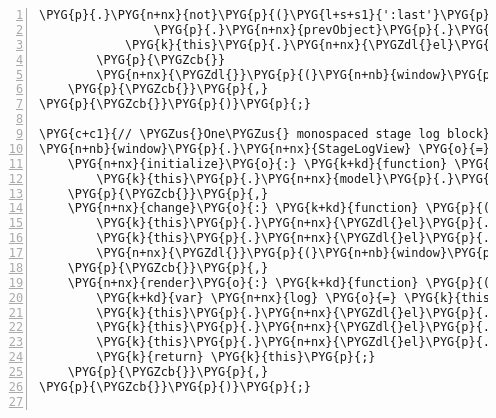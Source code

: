 \begin{Verbatim}[commandchars=\\\{\},numbers=left,firstnumber=1,stepnumber=5]
                \PYG{p}{.}\PYG{n+nx}{not}\PYG{p}{(}\PYG{l+s+s1}{':last'}\PYG{p}{)}\PYG{p}{.}\PYG{n+nx}{css}\PYG{p}{(}\PYG{l+s+s1}{'background-color'}\PYG{p}{,} \PYG{l+s+s1}{''}\PYG{p}{)}
                \PYG{p}{.}\PYG{n+nx}{prevObject}\PYG{p}{.}\PYG{n+nx}{last}\PYG{p}{(}\PYG{p}{)}\PYG{p}{.}\PYG{n+nx}{css}\PYG{p}{(}\PYG{l+s+s1}{'background-color'}\PYG{p}{,} \PYG{l+s+s1}{'\PYGZsh{}ddf'}\PYG{p}{)}\PYG{p}{;}
            \PYG{k}{this}\PYG{p}{.}\PYG{n+nx}{\PYGZdl{}el}\PYG{p}{.}\PYG{n+nx}{contents}\PYG{p}{(}\PYG{p}{)}\PYG{p}{.}\PYG{n+nx}{last}\PYG{p}{(}\PYG{p}{)}\PYG{p}{.}\PYG{n+nx}{scrollToBottom}\PYG{p}{(}\PYG{p}{)}\PYG{p}{;}
        \PYG{p}{\PYGZcb{}}
        \PYG{n+nx}{\PYGZdl{}}\PYG{p}{(}\PYG{n+nb}{window}\PYG{p}{)}\PYG{p}{.}\PYG{n+nx}{scrollspy}\PYG{p}{(}\PYG{l+s+s1}{'refresh'}\PYG{p}{)}\PYG{p}{;}
    \PYG{p}{\PYGZcb{}}\PYG{p}{,}
\PYG{p}{\PYGZcb{}}\PYG{p}{)}\PYG{p}{;}

\PYG{c+c1}{// \PYGZus{}One\PYGZus{} monospaced stage log block}
\PYG{n+nb}{window}\PYG{p}{.}\PYG{n+nx}{StageLogView} \PYG{o}{=} \PYG{n+nx}{Backbone}\PYG{p}{.}\PYG{n+nx}{View}\PYG{p}{.}\PYG{n+nx}{extend}\PYG{p}{(}\PYG{p}{\PYGZob{}}
    \PYG{n+nx}{initialize}\PYG{o}{:} \PYG{k+kd}{function} \PYG{p}{(}\PYG{p}{)} \PYG{p}{\PYGZob{}}
        \PYG{k}{this}\PYG{p}{.}\PYG{n+nx}{model}\PYG{p}{.}\PYG{n+nx}{bind}\PYG{p}{(}\PYG{l+s+s2}{"change"}\PYG{p}{,} \PYG{k}{this}\PYG{p}{.}\PYG{n+nx}{change}\PYG{p}{,} \PYG{k}{this}\PYG{p}{)}\PYG{p}{;}
    \PYG{p}{\PYGZcb{}}\PYG{p}{,}
    \PYG{n+nx}{change}\PYG{o}{:} \PYG{k+kd}{function} \PYG{p}{(}\PYG{n+nx}{model}\PYG{p}{,} \PYG{n+nx}{options}\PYG{p}{)} \PYG{p}{\PYGZob{}}
        \PYG{k}{this}\PYG{p}{.}\PYG{n+nx}{\PYGZdl{}el}\PYG{p}{.}\PYG{n+nx}{children}\PYG{p}{(}\PYG{l+s+s2}{"pre"}\PYG{p}{)}\PYG{p}{.}\PYG{n+nx}{text}\PYG{p}{(}\PYG{n+nx}{model}\PYG{p}{.}\PYG{n+nx}{get}\PYG{p}{(}\PYG{l+s+s1}{'text'}\PYG{p}{)}\PYG{p}{)}\PYG{p}{;}
        \PYG{k}{this}\PYG{p}{.}\PYG{n+nx}{\PYGZdl{}el}\PYG{p}{.}\PYG{n+nx}{scrollToBottom}\PYG{p}{(}\PYG{p}{)}\PYG{p}{;}
        \PYG{n+nx}{\PYGZdl{}}\PYG{p}{(}\PYG{n+nb}{window}\PYG{p}{)}\PYG{p}{.}\PYG{n+nx}{scrollspy}\PYG{p}{(}\PYG{l+s+s1}{'refresh'}\PYG{p}{)}\PYG{p}{;}
    \PYG{p}{\PYGZcb{}}\PYG{p}{,}
    \PYG{n+nx}{render}\PYG{o}{:} \PYG{k+kd}{function} \PYG{p}{(}\PYG{p}{)} \PYG{p}{\PYGZob{}}
        \PYG{k+kd}{var} \PYG{n+nx}{log} \PYG{o}{=} \PYG{k}{this}\PYG{p}{.}\PYG{n+nx}{model}\PYG{p}{.}\PYG{n+nx}{toJSON}\PYG{p}{(}\PYG{p}{)}\PYG{p}{;}
        \PYG{k}{this}\PYG{p}{.}\PYG{n+nx}{\PYGZdl{}el}\PYG{p}{.}\PYG{n+nx}{attr}\PYG{p}{(}\PYG{l+s+s1}{'id'}\PYG{p}{,} \PYG{n+nx}{log}\PYG{p}{.}\PYG{n+nx}{stage}\PYG{p}{)}\PYG{p}{;}
        \PYG{k}{this}\PYG{p}{.}\PYG{n+nx}{\PYGZdl{}el}\PYG{p}{.}\PYG{n+nx}{append}\PYG{p}{(}\PYG{n+nx}{el}\PYG{p}{.}\PYG{n+nx}{h4}\PYG{p}{(}\PYG{n+nx}{log}\PYG{p}{.}\PYG{n+nx}{stage}\PYG{p}{)}\PYG{p}{)}\PYG{p}{;}
        \PYG{k}{this}\PYG{p}{.}\PYG{n+nx}{\PYGZdl{}el}\PYG{p}{.}\PYG{n+nx}{append}\PYG{p}{(}\PYG{n+nx}{el}\PYG{p}{.}\PYG{n+nx}{pre}\PYG{p}{(}\PYG{n+nx}{log}\PYG{p}{.}\PYG{n+nx}{text}\PYG{p}{)}\PYG{p}{)}\PYG{p}{;}
        \PYG{k}{return} \PYG{k}{this}\PYG{p}{;}
    \PYG{p}{\PYGZcb{}}\PYG{p}{,}
\PYG{p}{\PYGZcb{}}\PYG{p}{)}\PYG{p}{;}


\end{Verbatim}
